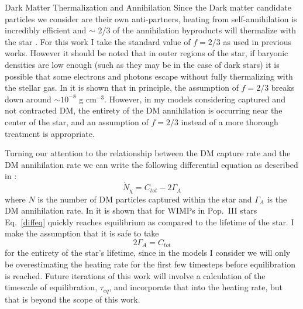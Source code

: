 \documentclass[a4paper,11pt]{article}
\begin{document}
\begin{section}{Dark Matter Thermalization and Annihilation}
    Since the Dark matter candidate particles we consider are their own anti-partners, heating from self-annihilation is incredibly efficient and $\sim$ 2/3 of the annihilation byproducts will thermalize with the star \cite{Ilie:2019}.
    For this work I take the standard value of $f = 2/3$ as used in previous works.
    However it should be noted that in outer regions of the star, if baryonic densities are low enough (such as they may be in the case of dark stars) it is possible that some electrons and photons escape without fully thermalizing with the stellar gas.
    In \cite{Rindler-Daller:2020} it is shown that in principle, the assumption of $f = 2/3$ breaks down around $\sim 10^{-8}$ g cm$^{-3}$.
    However, in my models considering captured and not contracted DM, the entirety of the DM annihilation is occurring near the center of the star, and an assumption of $f=2/3$ instead of a more thorough treatment is appropriate. 

    Turning our attention to the relationship between the DM capture rate and the DM annihilation rate we can write the following differential equation as described in \cite{Ilie:2019}:
    \begin{equation}
        \dot{N}_\chi = C_{tot} - 2\Gamma_A 
        \label{diffeq}
    \end{equation}
    where $N$ is the number of DM particles captured within the star and $\Gamma_A$ is the DM annihilation rate. In \cite{Freese:2008cap} it is shown that for WIMPs in Pop.~III stars Eq.~\ref{diffeq} quickly reaches equilibrium as compared to the lifetime of the star. I make the assumption that it is safe to take
    \begin{equation}
        2\Gamma_A = C_{tot} 
        \label{rates}
    \end{equation}
    for the entirety of the star's lifetime, since in the models I consider we will only be overestimating the heating rate for the first few timesteps before equilibration is reached.
    Future iterations of this work will involve a calculation of the timescale of equilibration, $\tau_{eq}$, and incorporate that into the heating rate, but that is beyond the scope of this work.
\end{section}
\end{document}
